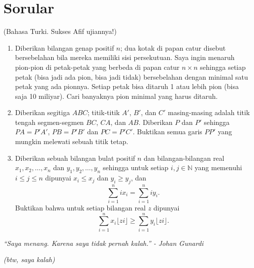 \documentclass{article}
\begin{document}
	\section{Sorular}
	(Bahasa Turki. Sukses Afif ujiannya!)
	\vspace{1em}
	\begin{enumerate}
		\item Diberikan bilangan genap positif $n$; dua kotak di papan catur disebut bersebelahan bila mereka memiliki sisi persekutuan. Saya ingin menaruh pion-pion di petak-petak yang berbeda di papan catur $n \times n$ sehingga setiap petak (bisa jadi ada pion, bisa jadi tidak) bersebelahan dengan minimal satu petak yang ada pionnya. Setiap petak bisa ditaruh 1 atau lebih pion (bisa saja 10 miliyar). Cari banyaknya pion minimal yang harus ditaruh.
		\item Diberikan segitiga $ABC$; titik-titik $A'$, $B'$, dan $C'$ masing-masing adalah titik tengah segmen-segmen $BC$, $CA$, dan $AB$. Diberikan $P$ dan $P'$ sehingga $PA = P'A'$, $PB = P'B'$ dan $PC = P'C'$. Buktikan semua garis $PP'$ yang mungkin melewati sebuah titik tetap.
		\item Diberikan sebuah bilangan bulat positif $n$ dan bilangan-bilangan real $x_1, x_2, \dotsc, x_n$ dan $y_1, y_2, \dotsc, y_n$ sehingga untuk setiap $i, j \in \mathbb{N}$ yang memenuhi $i \le j \le n$ dipunyai $x_i \le x_j$ dan $y_i \ge y_j$, dan
			\[ \sum_{i=1}^n ix_i = \sum_{i=1}^n iy_i. \]
		Buktikan bahwa untuk setiap bilangan real $z$ dipunyai \[ \sum_{i=1}^n x_i \lfloor zi \rfloor \ge \sum_{i=1}^n y_i \lfloor zi \rfloor. \]
	\end{enumerate}
	\begin{center}
		\textit{``Saya menang. Karena saya tidak pernah kalah.'' - Johan Gunardi}
		
		\vspace{1em}
		
		\textit{(btw, saya kalah)}
	\end{center}
\end{document}
